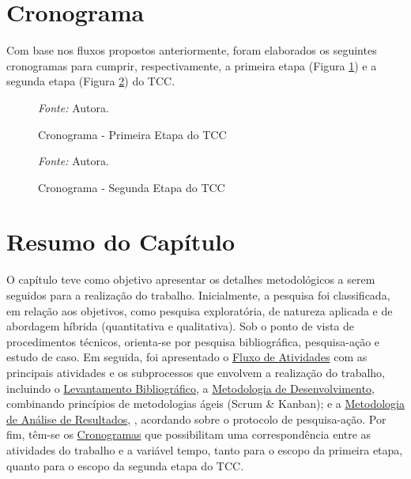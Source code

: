 \section{Cronograma}
\label{sec:Cronograma}
Com base nos fluxos propostos anteriormente, foram elaborados os seguintes cronogramas para cumprir, respectivamente, a primeira etapa (Figura \ref{fig06}) e a segunda etapa (Figura \ref{fig07}) do TCC.

\begin{figure}[h!]
	\centering
	\caption{Cronograma - Primeira Etapa do TCC}
	\begin{tablenotes}[flushleft]
		\centering
		\item \textit{Fonte:} Autora.
	\end{tablenotes}
	\label{fig06}
\end{figure}

\pagebreak

\begin{figure}[h!]
	\centering
	\caption{Cronograma - Segunda Etapa do TCC}
	\begin{tablenotes}[flushleft]
		\centering
		\item \textit{Fonte:} Autora.
	\end{tablenotes}
	\label{fig07}
\end{figure}

\section{Resumo do Capítulo}
\label{sec:Resumo do Capitulo}
O capítulo teve como objetivo apresentar os detalhes metodológicos a serem seguidos para a realização do trabalho. Inicialmente, a pesquisa foi classificada, em relação aos objetivos, como pesquisa exploratória, de natureza aplicada 
e de abordagem híbrida (quantitativa e qualitativa). Sob o ponto de vista de procedimentos técnicos, orienta-se por pesquisa bibliográfica, pesquisa-ação e estudo de caso. Em seguida, foi apresentado o \hyperref[sec:Fluxo de Atividades]{Fluxo de Atividades}
com as principais atividades e os subprocessos que envolvem a realização do trabalho, incluindo o \hyperref[sec:Levantamento Bibliografico]{Levantamento Bibliográfico}, a \hyperref[sec:Metodologia de Desenvolvimento]{Metodologia de Desenvolvimento}, combinando princípios de metodologias ágeis (Scrum \& Kanban); e a 
\hyperref[sec:Metodologia de Analise de Resultados]{Metodologia de Análise de Resultados}, , acordando sobre o protocolo de pesquisa-ação. Por fim, têm-se os \hyperref[sec:Cronograma]{Cronogramas} que possibilitam uma correspondência entre as atividades do trabalho e a variável tempo, tanto para o escopo da primeira 
etapa, quanto para o escopo da segunda etapa do TCC.